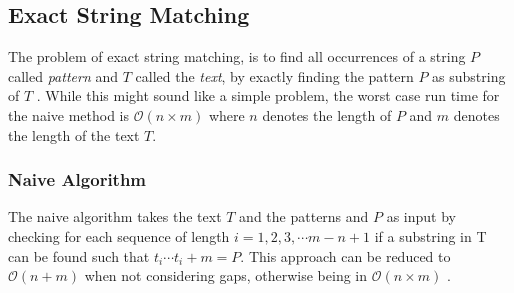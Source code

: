 \subsection{Exact String Matching}
\label{exact}
The problem of exact string matching, is to find all occurrences of a string $P$ called \textit{pattern} and $T$ called the \textit{text}, by exactly finding the pattern $P$ as substring of $T$ \cite{Gusfield1997}. While this might sound like a simple problem, the worst case run time for the naive method is $\mathcal{O}({n}\times{m})$ where $n$ denotes the length of $P$ and $m$ denotes the length of the text $T$.

\subsubsection{Naive Algorithm}
The naive algorithm takes the text $T$ and the patterns and $P$ as input by checking for each sequence of length $i = 1, 2, 3, \cdots m-n+ 1 $ if a substring in T can be found such that $t_i \cdots t_i+m = P$. This approach can be reduced to $\mathcal{O}({n}+{m})$ when not considering gaps, otherwise being in $\mathcal{O}({n}\times{m})$ \cite{Gusfield1997}.

